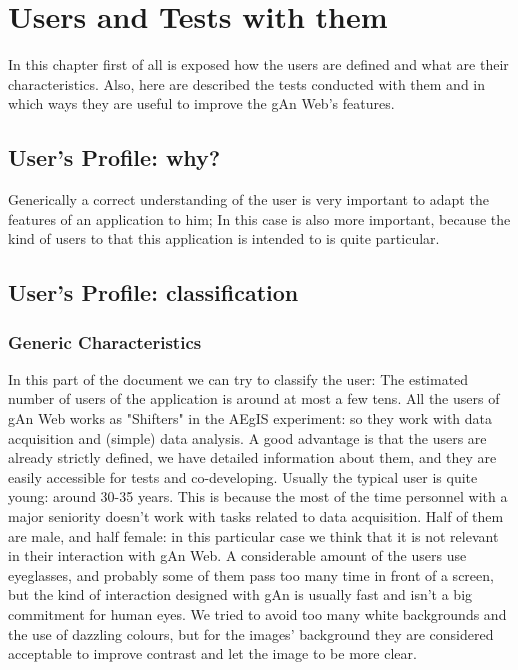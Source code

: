 
\chapter{Users and Tests with them} %

\label{Chapter8} %

In this chapter first of all is exposed how the users are defined and what are their characteristics. Also, here are described the tests conducted with them and in which ways they are useful to improve the gAn Web's features.   

\section{User's Profile: why?}

Generically a correct understanding of the user is very important to adapt the features of an application to him; In this case is also more important, because the kind of users to that this application is intended to is quite particular.


\section{User's Profile: classification}

\subsection{Generic Characteristics}
In this part of the document we can try to classify the user:
The estimated number of users of the application is around at most a few tens.
All the users of gAn Web works as "Shifters" in the AEgIS experiment: so they work with data acquisition and (simple) data analysis.
A good advantage is that the users are already strictly defined, we have detailed information about them, and they are easily accessible for tests and co-developing.
Usually the typical user is quite young: around 30-35 years. This is because the most of the time personnel with a major seniority doesn't work with tasks related to data acquisition. 
Half of them are male, and half female: in this particular case we think that it is not relevant in their interaction with gAn Web.
A considerable amount of the users use eyeglasses, and probably some of them pass too many time in front of a screen, but the kind of interaction designed with gAn is usually fast and isn't a big commitment for human eyes. We tried to avoid too many white backgrounds and the use of dazzling colours, but for the images' background they are considered acceptable to improve contrast and let the image to be more clear.  

